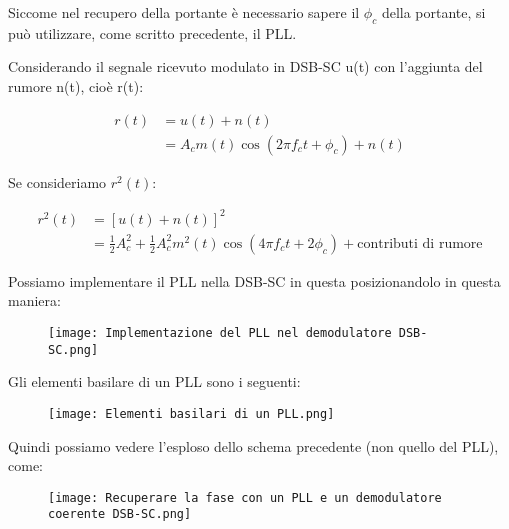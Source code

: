 Siccome nel recupero della portante è necessario sapere il $\phi_c$ della portante, 
si può utilizzare, come scritto precedente, il PLL. \newline 

Considerando il segnale ricevuto modulato in DSB-SC u(t) con l'aggiunta del rumore n(t), cioè r(t):

{
    \Large 
    \begin{equation}
        \begin{split}
            r(t)
            &= 
            u(t)
            +
            n(t)
            \\
            &= 
            A_c m(t) \cos(2 \pi f_c t + \phi_c) + n(t)
        \end{split}
    \end{equation}
}

Se consideriamo $r^{2} (t)$: 

{
    \Large 
    \begin{equation}
        \begin{split}
            r^{2}(t)
            &= 
            \left[
            u(t)
            + 
            n(t)
            \right]^{2}
            \\
            &= 
            \frac{1}{2} A_c ^{2}
            +
            \frac{1}{2} A_c ^{2} m^{2}(t) \cos(4 \pi f_c t + 2 \phi_c) + \text{contributi di rumore}
        \end{split}
    \end{equation}
}

Possiamo implementare il PLL nella DSB-SC in questa posizionandolo in questa maniera: 

\begin{figure}[h]
    \centering
    \texttt{[image: Implementazione del PLL nel demodulatore DSB-SC.png]}
\end{figure} 

Gli elementi basilare di un PLL sono i seguenti: 

\begin{figure}[h]
    \centering
    \texttt{[image: Elementi basilari di un PLL.png]}
\end{figure} 

Quindi possiamo vedere l'esploso dello schema precedente (non quello del PLL), come: 

\begin{figure}[h]
    \centering
    \texttt{[image: Recuperare la fase con un PLL e un demodulatore coerente DSB-SC.png]}
\end{figure} 


